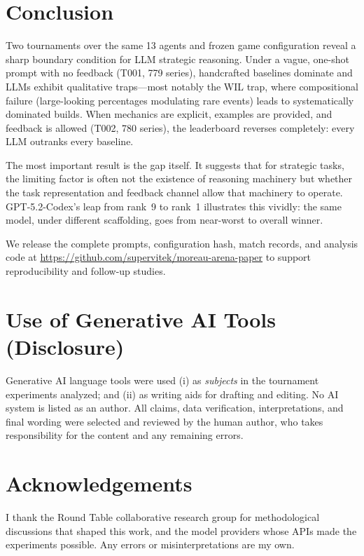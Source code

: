 \documentclass[11pt]{article}
\newcommand{\tOne}{T001}
\newcommand{\tTwo}{T002}
\begin{document}
\section{Conclusion}

Two tournaments over the same 13 agents and frozen game configuration reveal a sharp boundary condition for LLM strategic reasoning.
Under a vague, one-shot prompt with no feedback (\tOne, 779 series), handcrafted baselines dominate and LLMs exhibit qualitative traps---most notably the WIL trap, where compositional failure (large-looking percentages modulating rare events) leads to systematically dominated builds.
When mechanics are explicit, examples are provided, and feedback is allowed (\tTwo, 780 series), the leaderboard reverses completely: every LLM outranks every baseline.

The most important result is the gap itself.
It suggests that for strategic tasks, the limiting factor is often not the existence of reasoning machinery but whether the task representation and feedback channel allow that machinery to operate.
GPT-5.2-Codex's leap from rank~9 to rank~1 illustrates this vividly: the same model, under different scaffolding, goes from near-worst to overall winner.

We release the complete prompts, configuration hash, match records, and analysis code at \url{https://github.com/supervitek/moreau-arena-paper} to support reproducibility and follow-up studies.

\section*{Use of Generative AI Tools (Disclosure)}
Generative AI language tools were used (i) as \emph{subjects} in the tournament experiments analyzed; and (ii) as writing aids for drafting and editing.
No AI system is listed as an author.
All claims, data verification, interpretations, and final wording were selected and reviewed by the human author, who takes responsibility for the content and any remaining errors.

\section*{Acknowledgements}
I thank the Round Table collaborative research group for methodological discussions that shaped this work, and the model providers whose APIs made the experiments possible.
Any errors or misinterpretations are my own.
\end{document}
